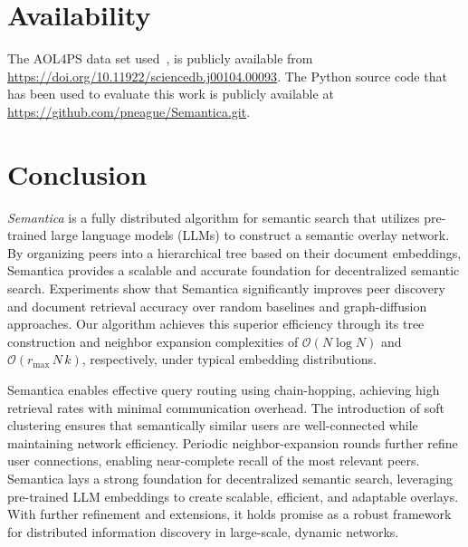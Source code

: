 \documentclass[10pt,journal]{IEEEtran}
\begin{document}
\section{Availability}
The AOL4PS data set used~\cite{guo2021aol4ps}, is publicly available from \url{https://doi.org/10.11922/sciencedb.j00104.00093}.
The Python source code that has been used to evaluate this work is publicly available at \url{https://github.com/pneague/Semantica.git}.

\section{Conclusion}
\label{sec:conclusion}

\emph{Semantica} is a fully distributed algorithm for semantic search that utilizes pre-trained large language models (LLMs) to construct a semantic overlay network. By organizing peers into a hierarchical tree based on their document embeddings, Semantica provides a scalable and accurate foundation for decentralized semantic search. Experiments show that Semantica significantly improves peer discovery and document retrieval accuracy over random baselines and graph-diffusion approaches. Our algorithm achieves this superior efficiency through its tree construction and neighbor expansion complexities of \(\mathcal{O}(N \log N)\) and \(\mathcal{O}(r_{\max} \, N \, k)\), respectively, under typical embedding distributions.

Semantica enables effective query routing using chain-hopping, achieving high retrieval rates with minimal communication overhead. The introduction of soft clustering ensures that semantically similar users are well-connected while maintaining network efficiency. Periodic neighbor-expansion rounds further refine user connections, enabling near-complete recall of the most relevant peers.
%
%
Semantica lays a strong foundation for decentralized semantic search, leveraging pre-trained LLM embeddings to create scalable, efficient, and adaptable overlays. With further refinement and extensions, it holds promise as a robust framework for distributed information discovery in large-scale, dynamic networks.


%



\end{document}
